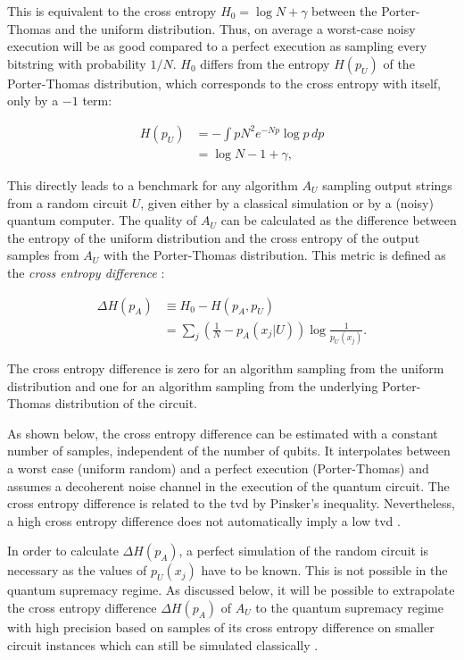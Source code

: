 This is equivalent to the cross entropy $H_0 = \log{N} + \gamma$ between the
Porter-Thomas and the uniform distribution. Thus, on
average a worst-case noisy execution will be as good compared to a perfect execution as sampling
every bitstring with probability $1/N$. $H_0$ differs from the entropy $H(p_U)$ of
the Porter-Thomas distribution, which corresponds to the cross entropy with
itself, only by a $-1$ term:

\begin{align}
  H(p_U) &= - \int p N^2e^{-Np}\log{p} \, dp \\
         &= \log{N} -1 + \gamma,
\end{align}

This directly leads to a benchmark for any algorithm $A_U$ sampling output strings from a
random circuit $U$, given either by a
classical simulation or by a (noisy) quantum computer. The quality of 
$A_U$ can be calculated as the difference between
the entropy of the uniform distribution and the cross entropy of the output
samples from $A_U$ with the Porter-Thomas distribution. This metric is
defined as the \textit{cross entropy difference} \cite{Boixo2018supremacy}:

\begin{align}
  \Delta H(p_A) &\equiv H_0 - H(p_A, p_U) \\
                 &=\sum_j \left(\frac{1}{N} - p_A(x_j|U)\right)\log{\frac{1}{p_U(x_j)}}.
\end{align}

The cross entropy difference is zero for an algorithm sampling from the uniform
distribution and one for an algorithm sampling from the underlying Porter-Thomas
distribution of the circuit.

As shown below, the cross entropy difference can be estimated with a constant 
number of samples, independent of the number of qubits. It interpolates between 
a worst case (uniform random) and a perfect execution (Porter-Thomas) and assumes 
a decoherent noise channel in the execution of the quantum circuit. 
The cross entropy difference is related to the \gls{tvd} by Pinsker's inequality. Nevertheless, 
a high cross entropy difference does not automatically imply a low \gls{tvd} \cite{bouland2018quantum}.

In order to calculate $\Delta H(p_A)$, 
a perfect simulation of the random circuit is necessary as the values of $p_U(x_j)$ have to be known. This is not possible in the quantum
supremacy regime. As discussed below, it will be possible
to extrapolate the cross entropy difference $\Delta H(p_A)$ of $A_U$ to the quantum supremacy regime with high
precision based on samples of its cross entropy difference on smaller circuit
instances which can still be simulated classically \cite{Boixo2018supremacy}.

